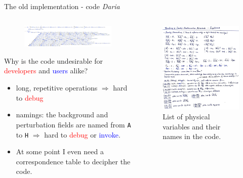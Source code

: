 \documentclass[11pt,aspectratio=169]{beamer}
\begin{document}
\begin{frame}{The old implementation - code \textit{Daria}}
	\begin{columns}
	\begin{column}{.6\linewidth}
		\begin{figure}
			\centering
			\includegraphics[width=\linewidth]{elements/Mathematica_snippet_1.png}
		\end{figure}
		Why is the code undesirable for \textcolor{red}{developers} and \textcolor{blue}{users} alike?
		\begin{itemize}
			\item long, repetitive operations $\Longrightarrow$ hard to \textcolor{red}{debug}
			\item namings: the background and perturbation fields are named from \texttt{A} to \texttt{H} $\Longrightarrow$ hard to \textcolor{red}{debug} or \textcolor{blue}{invoke}.
			\item At some point I even need a correspondence table to decipher the code.
		\end{itemize}
	\end{column}
	\pause
	\begin{column}{.4\linewidth}
		\begin{figure}
			\centering
			\includegraphics[width=.9\linewidth]{elements/correspondence_table.jpeg}
			\caption{List of physical variables and their names in the code.}
		\end{figure}
	\end{column}
	\end{columns}
\end{frame}
\end{document}

